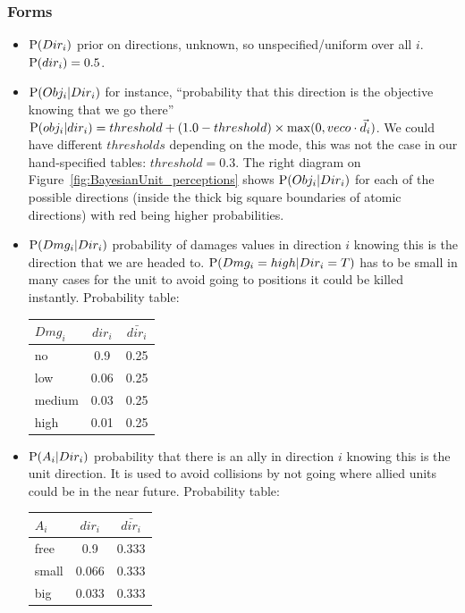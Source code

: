\subsubsection{Forms}

\begin{itemize}
\item $\mathrm{P}(Dir_i)$ prior on directions, unknown, so unspecified/uniform over all $i$. $\mathrm{P}(dir_i) = 0.5$.

\item $\mathrm{P}(Obj_i | Dir_i)$ for instance, ``probability that this direction is the objective knowing that we go there'' $\mathrm{P}(obj_i | dir_i) = threshold + (1.0-threshold)\times \mathrm{max}(0, vec{o} \cdot \vec{d_i})$. %
We could have different $thresholds$ depending on the mode, this was not the case in our hand-specified tables: $threshold = 0.3$. The right diagram on Figure~\ref{fig:BayesianUnit_perceptions} shows $\mathrm{P}(Obj_i|Dir_i)$ for each of the possible directions (inside the thick big square boundaries of atomic directions) with red being higher probabilities.

\item $\mathrm{P}(Dmg_i | Dir_i)$ probability of damages values in direction $i$ knowing this is the direction that we are headed to. $\mathrm{P}(Dmg_i = high | Dir_i = T)$ has to be small in many cases for the unit to avoid going to positions it could be killed instantly. Probability table:\\
\begin{center}
\begin{tabular}{|l|c|c|}
\hline
$Dmg_i$ & $dir_i$ & $\bar{dir_i}$ \\
\hline
no & 0.9 & 0.25 \\
low & 0.06 & 0.25 \\
medium & 0.03 & 0.25 \\
high & 0.01 & 0.25 \\
\hline
\end{tabular}
\end{center}

\item $\mathrm{P}(A_i | Dir_i)$ probability that there is an ally in direction $i$ knowing this is the unit direction. It is used to avoid collisions by not going where allied units could be in the near future. Probability table:\\
\begin{center}
\begin{tabular}{|l|c|c|}
\hline
$A_i$ & $dir_i$ & $\bar{dir_i}$ \\
\hline
free & 0.9 & 0.333 \\
small & 0.066 & 0.333 \\
big & 0.033 & 0.333 \\
\hline
\end{tabular}
\end{center}
 


\end{itemize}
